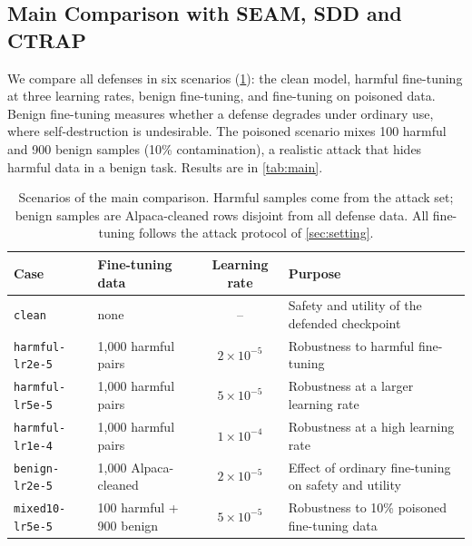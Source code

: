 \subsection{Main Comparison with SEAM, SDD and CTRAP}
\label{sec:exp_main}

We compare all defenses in six scenarios (\cref{tab:scenarios}): the clean model, harmful fine-tuning at three learning rates, benign fine-tuning, and fine-tuning on poisoned data. Benign fine-tuning measures whether a defense degrades under ordinary use, where self-destruction is undesirable. The poisoned scenario mixes 100 harmful and 900 benign samples (10\% contamination), a realistic attack that hides harmful data in a benign task. Results are in \cref{tab:main}.

\begin{table}[t]
\centering
\small
\caption{Scenarios of the main comparison. Harmful samples come from the attack set; benign samples are Alpaca-cleaned rows disjoint from all defense data. All fine-tuning follows the attack protocol of \cref{sec:setting}.}
\label{tab:scenarios}
\begin{tabular}{llcl}
\toprule
Case & Fine-tuning data & Learning rate & Purpose\\
\midrule
\texttt{clean}          & none                       & --                 & Safety and utility of the defended checkpoint\\
\texttt{harmful-lr2e-5} & 1{,}000 harmful pairs      & $2\times10^{-5}$  & Robustness to harmful fine-tuning\\
\texttt{harmful-lr5e-5} & 1{,}000 harmful pairs      & $5\times10^{-5}$  & Robustness at a larger learning rate\\
\texttt{harmful-lr1e-4} & 1{,}000 harmful pairs      & $1\times10^{-4}$  & Robustness at a high learning rate\\
\texttt{benign-lr2e-5}  & 1{,}000 Alpaca-cleaned     & $2\times10^{-5}$  & Effect of ordinary fine-tuning on safety and utility\\
\texttt{mixed10-lr5e-5} & 100 harmful + 900 benign   & $5\times10^{-5}$  & Robustness to 10\% poisoned fine-tuning data\\
\bottomrule
\end{tabular}
\end{table}

